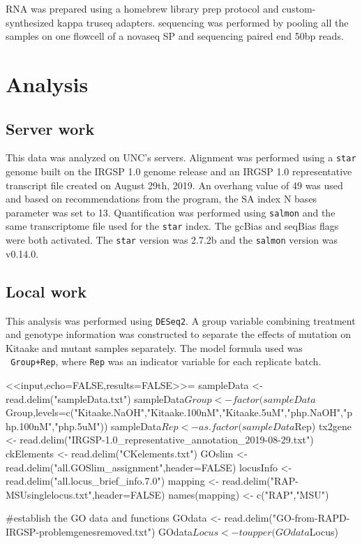 \documentclass{article}
\begin{document}
RNA was prepared using a homebrew library prep protocol and custom-synthesized kappa truseq adapters. sequencing was performed by pooling all the samples on one flowcell of a novaseq SP and sequencing paired end 50bp reads.


\section{Analysis}
\subsection{Server work}
This data was analyzed on UNC's servers. Alignment was performed using a \texttt{star} genome built on the IRGSP 1.0 genome release and an IRGSP 1.0 representative transcript file created on August 29th, 2019. An overhang value of 49 was used and based on recommendations from the program, the SA index N bases parameter was set to 13. Quantification was performed using \texttt{salmon} and the same transcriptome file used for the \texttt{star} index. The gcBias and seqBias flags were both activated. The \texttt{star} version was 2.7.2b and the \texttt{salmon} version was v0.14.0.

\subsection{Local work}
This analysis was performed using \texttt{DESeq2}. A group variable combining treatment and genotype information was constructed to separate the effects of mutation on Kitaake and mutant samples separately. The model formula used was \texttt{~Group+Rep}, where \texttt{Rep} was an indicator variable for each replicate batch.


<<input,echo=FALSE,results=FALSE>>=
sampleData <- read.delim("sampleData.txt")
sampleData$Group <- factor(sampleData$Group,levels=c("Kitaake.NaOH","Kitaake.100nM","Kitaake.5uM","php.NaOH","php.100nM","php.5uM"))
sampleData$Rep <- as.factor(sampleData$Rep)
tx2gene <- read.delim("IRGSP-1.0_representative_annotation_2019-08-29.txt")
ckElements <- read.delim("CKelements.txt")
GOslim <- read.delim("all.GOSlim_assignment",header=FALSE)
locusInfo <- read.delim("all.locus_brief_info.7.0")
mapping <- read.delim("RAP-MSUsinglelocus.txt",header=FALSE)
names(mapping) <- c("RAP","MSU")

#establish the GO data and functions
GOdata <- read.delim("GO-from-RAPD-IRGSP-problemgenesremoved.txt")
GOdata$Locus <- toupper(GOdata$Locus)
\end{document}
